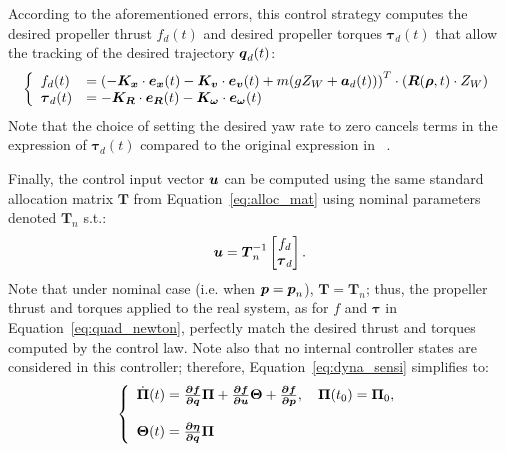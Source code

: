 According to the aforementioned errors, this control strategy computes the desired propeller thrust $f_d(t)$ and desired propeller torques $\boldsymbol{\tau}_d(t)$ that allow the tracking of the desired trajectory $\boldsymbol{q}_d(t)$:
\begin{equation}\label{eq:desftau}
  \left \{
    \begin{array}{l l}
      f_d(t) &= \left( -\boldsymbol{K_x} \cdot \boldsymbol{e_x}(t) - \boldsymbol{K_v} \cdot \boldsymbol{e_v}(t) + m(g Z_W + \boldsymbol{a}_d(t)) \right)^T \cdot (\boldsymbol{R}(\boldsymbol{\rho}, t) \cdot Z_W) \\
      \boldsymbol{\tau}_d(t) &= -\boldsymbol{K_R} \cdot \boldsymbol{e_R}(t) - \boldsymbol{K_\omega} \cdot \boldsymbol{e_\omega}(t)
    \end{array}
  \right .
\end{equation}
Note that the choice of setting the desired yaw rate to zero cancels terms in the expression of $\boldsymbol{\tau}_d(t)$ compared to the original expression in ~\cite{cLee}.

Finally, the control input vector $\boldsymbol{u}$ can be computed using the same standard allocation matrix $\boldsymbol{T}$ from Equation~\ref{eq:alloc_mat} using nominal parameters denoted $\boldsymbol{T}_n$ s.t.:
\begin{equation}\label{eq:control_lee}
  \boldsymbol{u} = \boldsymbol{T}_n^{-1}\begin{bmatrix}
        f_d \\
        \boldsymbol{\tau}_d
      \end{bmatrix}.
\end{equation}
Note that under nominal case (i.e. when $\boldsymbol{p} = \boldsymbol{p}_n$), $\boldsymbol{T} = \boldsymbol{T}_n$; thus, the propeller thrust and torques applied to the real system, as for $f$ and $\boldsymbol{\tau}$ in Equation~\ref{eq:quad_newton}, perfectly match the desired thrust and torques computed by the control law.
Note also that no internal controller states are considered in this controller; therefore, Equation~\ref{eq:dyna_sensi} simplifies to:
\begin{equation}\label{eq:dyna_sensi_simp}
  \left \{
  \begin{array}{l l}
       \dot{\boldsymbol{\Pi}}(t) = \boldsymbol{\frac{\partial{f}}{\partial{q}}}\boldsymbol{\Pi}+ \boldsymbol{\frac{\partial{f}}{\partial{u}}}\boldsymbol{\Theta}+ \boldsymbol{\frac{\partial{f}}{\partial{p}}}, \quad \boldsymbol{\Pi}(t_0)=\boldsymbol{\Pi}_0, \\\\
       \boldsymbol{\Theta}(t) = \boldsymbol{\frac{\partial{\eta}}{\partial{q}}}\boldsymbol{\Pi} 
\end{array}
\right .
\end{equation}

